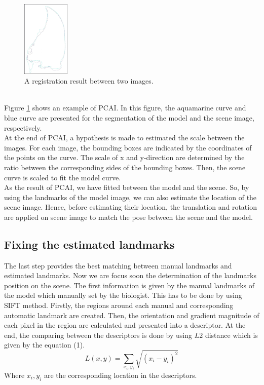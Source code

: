\documentclass[twoside,twocolumn,10pt]{article}
\begin{document}
\begin{figure}[htb]
    \centering
    \includegraphics[width=0.2\textwidth]{./images/imreg}
    \caption{A registration result between two images.}
    \label{fig:box}
\end{figure}~\\

Figure \ref{fig:box} shows an example of PCAI. In this figure, the aquamarine curve and blue curve are presented for the segmentation of the model and the scene image, respectively.\\

At the end of PCAI, a hypothesis is made to estimated the scale between the images. For each image, the bounding boxes are indicated by the coordinates of the points on the curve. The scale of x and y-direction are determined by the ratio between the corresponding sides of the bounding boxes. Then, the scene curve is scaled to fit the model curve.\\

As the result of PCAI, we have fitted between the model and the scene. So, by using the landmarks of the model image, we can also estimate the location of the scene image. Hence, before estimating their location, the translation and rotation are applied on scene image to match the pose between the scene and the model. 

\subsection{Fixing the estimated landmarks}
The last step provides the best matching between manual landmarks and estimated landmarks. Now we are focus soon the determination of the landmarks position on the scene. The first information is given by the manual landmarks of the model which manually set by the biologist. This has to be done by using SIFT\cite{lowe2004distinctive} method. Firstly, the regions around each manual and corresponding automatic landmark are created. Then, the orientation and gradient magnitude of each pixel in the region are calculated and presented into a descriptor. At the end, the comparing between the descriptors is done by using $L2$ distance which is given by the equation (1).
\begin{equation}
\label{eq:cross-correlation}
	L(x,y) = \sum\limits_{x_i,y_i}\sqrt{(x_i-y_i)^2}
\end{equation}
Where $x_i, y_i $ are the corresponding location in the descriptors.\\
\end{document}
